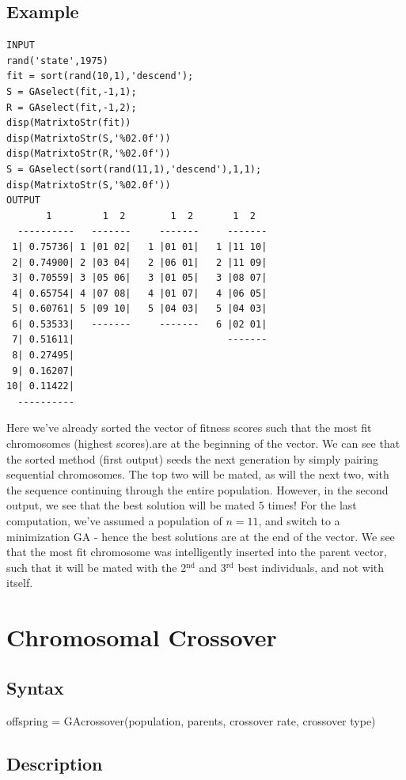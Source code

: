 \documentclass{book}
\newcommand{\textcode}[1]{\textsf{\small #1}}   %
\begin{document}
\subsection*{Example}
\begin{verbatim}
INPUT
rand('state',1975)
fit = sort(rand(10,1),'descend');
S = GAselect(fit,-1,1);
R = GAselect(fit,-1,2);
disp(MatrixtoStr(fit))
disp(MatrixtoStr(S,'%02.0f'))
disp(MatrixtoStr(R,'%02.0f'))
S = GAselect(sort(rand(11,1),'descend'),1,1);
disp(MatrixtoStr(S,'%02.0f'))
OUTPUT
       1         1  2        1  2       1  2
  ----------   -------     -------     -------
 1| 0.75736| 1 |01 02|   1 |01 01|   1 |11 10|
 2| 0.74900| 2 |03 04|   2 |06 01|   2 |11 09|
 3| 0.70559| 3 |05 06|   3 |01 05|   3 |08 07|
 4| 0.65754| 4 |07 08|   4 |01 07|   4 |06 05|
 5| 0.60761| 5 |09 10|   5 |04 03|   5 |04 03|
 6| 0.53533|   -------     -------   6 |02 01|
 7| 0.51611|                           -------
 8| 0.27495|
 9| 0.16207|
10| 0.11422|
  ----------
\end{verbatim}
Here we've already sorted the vector of fitness scores such
that the most fit chromosomes (highest scores).are at the
beginning of the vector. We can see that the sorted method
(first output) seeds the next generation by simply pairing
sequential chromosomes. The top two will be mated, as will the
next two, with the sequence continuing through the entire
population.
However, in the second output, we see that the best solution will be mated $%
5 $ times! For the last computation, we've assumed a population of $n=11$,
and switch to a minimization GA - hence the best solutions are at the end of
the vector. We see that the most fit chromosome was intelligently inserted
into the parent vector, such that it will be mated with the 2$^{\text{nd}}$
and 3$^{\text{rd}}$ best individuals, and not with itself.

\section{Chromosomal Crossover}

\subsection*{Syntax}

\textcode{offspring = GAcrossover(population, parents,
crossover rate, crossover type)}

\subsection*{Description}
\end{document}

